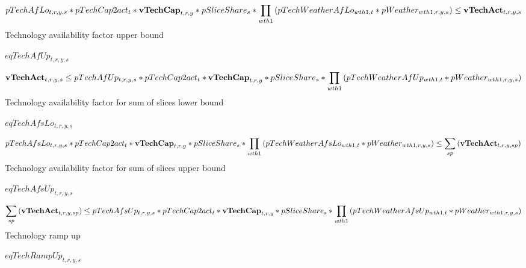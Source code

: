 \documentclass{article}
\begin{document}
\begin{dmath} 
pTechAfLo_{t,r,y,s}*pTechCap2act_{t}*{\bf vTechCap}_{t,r,y}*pSliceShare_{s}*\prod_{wth1}{\left(pTechWeatherAfLo_{wth1,t}*pWeather_{wth1,r,y,s}\right)}  \le  {\bf vTechAct}_{t,r,y,s}
\end{dmath} 
Technology availability factor upper bound







$eqTechAfUp_{t,r,y,s}$





\begin{dmath} 
{\bf vTechAct}_{t,r,y,s}  \le  pTechAfUp_{t,r,y,s}*pTechCap2act_{t}*{\bf vTechCap}_{t,r,y}*pSliceShare_{s}*\prod_{wth1}{\left(pTechWeatherAfUp_{wth1,t}*pWeather_{wth1,r,y,s}\right)}
\end{dmath} 
Technology availability factor for sum of slices lower bound







$eqTechAfsLo_{t,r,y,s}$





\begin{dmath} 
pTechAfsLo_{t,r,y,s}*pTechCap2act_{t}*{\bf vTechCap}_{t,r,y}*pSliceShare_{s}*\prod_{wth1}{\left(pTechWeatherAfsLo_{wth1,t}*pWeather_{wth1,r,y,s}\right)}  \le  \sum_{sp}{\left({\bf vTechAct}_{t,r,y,sp}\right)}
\end{dmath} 
Technology availability factor for sum of slices upper bound







$eqTechAfsUp_{t,r,y,s}$





\begin{dmath} 
\sum_{sp}{\left({\bf vTechAct}_{t,r,y,sp}\right)}  \le  pTechAfsUp_{t,r,y,s}*pTechCap2act_{t}*{\bf vTechCap}_{t,r,y}*pSliceShare_{s}*\prod_{wth1}{\left(pTechWeatherAfsUp_{wth1,t}*pWeather_{wth1,r,y,s}\right)}
\end{dmath} 
Technology ramp up







$eqTechRampUp_{t,r,y,s}$
\end{document}
